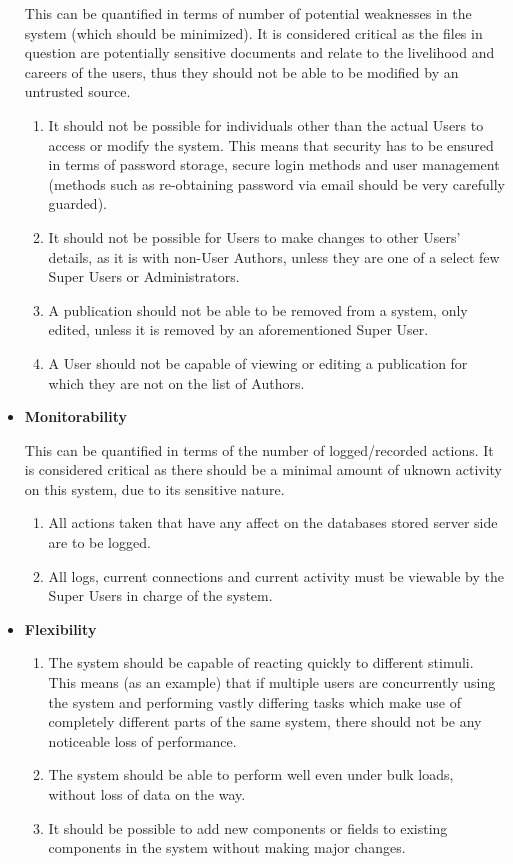 \documentclass[hidelinks,a4paper,12pt]{article}
\begin{document}
\begin{itemize}
				This can be quantified in terms of number of potential weaknesses in the system (which should be minimized). It is considered critical as the files in question are potentially sensitive documents and relate to the livelihood and careers of the users, thus they should not be able to be modified by an untrusted source.
				\begin{enumerate}
					\item It should not be possible for individuals other than the actual Users to access or modify the system. This means that security has to be ensured in terms of password storage, secure login methods and user management (methods such as re-obtaining password via email should be very carefully guarded).
					\item It should not be possible for Users to make changes to other Users' details, as it is with non-User Authors, unless they are one of a select few Super Users or Administrators.
					\item A publication should not be able to be removed from a system, only edited, unless it is removed by an aforementioned Super User.
					\item A User should not be capable of viewing or editing a publication for which they are not on the list of Authors.
				\end{enumerate}
				\item\textbf{ Monitorability}
				
				This can be quantified in terms of the number of logged/recorded actions. It is considered critical as there should be a minimal amount of uknown activity on this system, due to its sensitive nature. 
				\begin{enumerate}
					\item All actions taken that have any affect on the databases stored server side are to be logged.
					\item All logs, current connections and current activity must be viewable by the Super Users in charge of the system.
				\end{enumerate}
				\item \textbf{Flexibility}
				\begin{enumerate}
					\item The system should be capable of reacting quickly to different stimuli. This means (as an example) that if multiple users are concurrently using the system and performing vastly differing tasks which make use of completely different parts of the same system, there should not be any noticeable loss of performance.
					\item The system should be able to perform well even under bulk loads, without loss of data on the way.
					\item It should be possible to add new components or fields to existing components in the system without making major changes. 
				\end{enumerate}
			\end{itemize}
\end{document}
